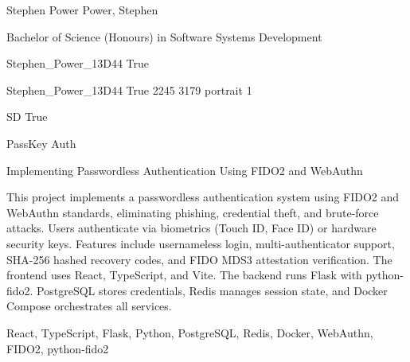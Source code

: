 \documentclass[twoside]{report}
\begin{document}
\begingroup{}\relax



\def\Key{Stephen_Power_13D44}

{Stephen Power}
{Power, Stephen}

{Bachelor of Science (Honours) in Software Systems Development}

{Stephen_Power_13D44}
{True}

{Stephen_Power_13D44}
{True}
{2245}
{3179}
{portrait}
{1}

{SD}
{True}

{PassKey Auth}

{Implementing Passwordless Authentication Using FIDO2 and WebAuthn}

{This project implements a passwordless authentication system using {FIDO2} and {WebAuthn} standards, eliminating phishing, credential theft, and brute-force attacks. Users authenticate via biometrics (Touch ID, Face ID) or hardware security keys. Features include usernameless login, multi-authenticator support, SHA-256 hashed recovery codes, and FIDO MDS3 attestation verification. The frontend uses React, TypeScript, and Vite. The backend runs Flask with python-fido2. PostgreSQL stores credentials, Redis manages session state, and Docker Compose orchestrates all services.}

{React, TypeScript, Flask, Python, PostgreSQL, Redis, Docker, WebAuthn, FIDO2, python-fido2}
\end{document}
